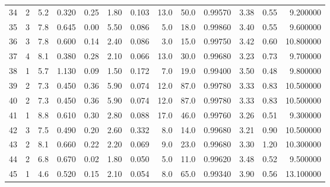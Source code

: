 \begin{tabular}{lrrrrrrrrrrrr}
34   &        2 &            5.2 &             0.320 &         0.25 &            1.80 &      0.103 &                 13.0 &                  50.0 &  0.99570 &  3.38 &       0.55 &   9.200000 \\
35   &        3 &            7.8 &             0.645 &         0.00 &            5.50 &      0.086 &                  5.0 &                  18.0 &  0.99860 &  3.40 &       0.55 &   9.600000 \\
36   &        3 &            7.8 &             0.600 &         0.14 &            2.40 &      0.086 &                  3.0 &                  15.0 &  0.99750 &  3.42 &       0.60 &  10.800000 \\
37   &        4 &            8.1 &             0.380 &         0.28 &            2.10 &      0.066 &                 13.0 &                  30.0 &  0.99680 &  3.23 &       0.73 &   9.700000 \\
38   &        1 &            5.7 &             1.130 &         0.09 &            1.50 &      0.172 &                  7.0 &                  19.0 &  0.99400 &  3.50 &       0.48 &   9.800000 \\
39   &        2 &            7.3 &             0.450 &         0.36 &            5.90 &      0.074 &                 12.0 &                  87.0 &  0.99780 &  3.33 &       0.83 &  10.500000 \\
40   &        2 &            7.3 &             0.450 &         0.36 &            5.90 &      0.074 &                 12.0 &                  87.0 &  0.99780 &  3.33 &       0.83 &  10.500000 \\
41   &        1 &            8.8 &             0.610 &         0.30 &            2.80 &      0.088 &                 17.0 &                  46.0 &  0.99760 &  3.26 &       0.51 &   9.300000 \\
42   &        3 &            7.5 &             0.490 &         0.20 &            2.60 &      0.332 &                  8.0 &                  14.0 &  0.99680 &  3.21 &       0.90 &  10.500000 \\
43   &        2 &            8.1 &             0.660 &         0.22 &            2.20 &      0.069 &                  9.0 &                  23.0 &  0.99680 &  3.30 &       1.20 &  10.300000 \\
44   &        2 &            6.8 &             0.670 &         0.02 &            1.80 &      0.050 &                  5.0 &                  11.0 &  0.99620 &  3.48 &       0.52 &   9.500000 \\
45   &        1 &            4.6 &             0.520 &         0.15 &            2.10 &      0.054 &                  8.0 &                  65.0 &  0.99340 &  3.90 &       0.56 &  13.100000 \\

\end{tabular}
